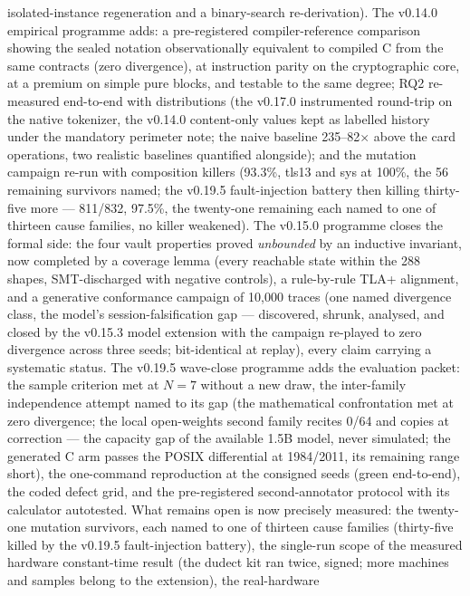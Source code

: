 \documentclass[10pt,a4paper]{article}
\begin{document}
isolated-instance regeneration and a binary-search re-derivation). The v0.14.0 empirical programme
adds: a pre-registered compiler-reference comparison showing the sealed
notation observationally equivalent to compiled C from the same contracts
(zero divergence), at instruction parity on the cryptographic core, at a
premium on simple pure blocks, and testable to the same degree; RQ2
re-measured end-to-end with distributions (the v0.17.0 instrumented
round-trip on the native tokenizer, the v0.14.0 content-only values
kept as labelled history under the mandatory perimeter note; the naive
baseline 235--82$\times$ above the card operations, two realistic
baselines quantified alongside); and the mutation campaign re-run with
composition killers (93.3\%, tls13 and sys at 100\%, the 56 remaining
survivors named; the v0.19.5 fault-injection battery then killing
thirty-five more --- 811/832, 97.5\%, the twenty-one remaining each
named to one of thirteen cause families, no killer weakened). The
v0.15.0 programme closes the formal side: the four vault
properties proved \emph{unbounded} by an inductive invariant, now
completed by a coverage lemma (every reachable state within the 288
shapes, SMT-discharged with negative controls), a rule-by-rule TLA+
alignment, and a generative conformance campaign of 10{,}000 traces
(one named divergence class, the model's session-falsification gap ---
discovered, shrunk, analysed, and closed by the v0.15.3 model
extension with the campaign re-played to zero divergence across three
seeds; bit-identical at replay), every claim carrying a systematic
status. The v0.19.5 wave-close programme adds the evaluation packet:
the sample criterion met at $N{=}7$ without a new draw, the
inter-family independence attempt named to its gap (the mathematical
confrontation met at zero divergence; the local open-weights second
family recites 0/64 and copies at correction --- the capacity gap of
the available 1.5B model, never simulated; the generated C arm passes
the POSIX differential at 1984/2011, its remaining range short), the
one-command reproduction at the consigned seeds (green end-to-end),
the coded defect grid, and the pre-registered second-annotator
protocol with its calculator autotested. What remains open
is now precisely measured: the twenty-one mutation survivors, each
named to one of thirteen cause families (thirty-five killed by the
v0.19.5 fault-injection battery), the single-run scope of the measured hardware constant-time
result (the dudect kit ran twice, signed; more machines and samples
belong to the extension), the real-hardware
\end{document}
